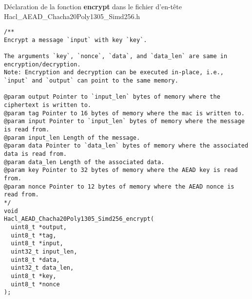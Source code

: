 \begin{figure}[!ht]
\end{figure}

\vfill
\begin{listing}[!ht]
  \caption{Déclaration de la fonction \textbf{encrypt} dans le fichier d'en-tête Hacl\_AEAD\_Chacha20Poly1305\_Simd256.h}
  \label{lst:exemple_header}
  \begin{verbatim}
/**
Encrypt a message `input` with key `key`.

The arguments `key`, `nonce`, `data`, and `data_len` are same in encryption/decryption.
Note: Encryption and decryption can be executed in-place, i.e.,
`input` and `output` can point to the same memory.

@param output Pointer to `input_len` bytes of memory where the ciphertext is written to.
@param tag Pointer to 16 bytes of memory where the mac is written to.
@param input Pointer to `input_len` bytes of memory where the message is read from.
@param input_len Length of the message.
@param data Pointer to `data_len` bytes of memory where the associated data is read from.
@param data_len Length of the associated data.
@param key Pointer to 32 bytes of memory where the AEAD key is read from.
@param nonce Pointer to 12 bytes of memory where the AEAD nonce is read from.
*/
void
Hacl_AEAD_Chacha20Poly1305_Simd256_encrypt(
  uint8_t *output,
  uint8_t *tag,
  uint8_t *input,
  uint32_t input_len,
  uint8_t *data,
  uint32_t data_len,
  uint8_t *key,
  uint8_t *nonce
);
  \end{verbatim}
\end{listing}

